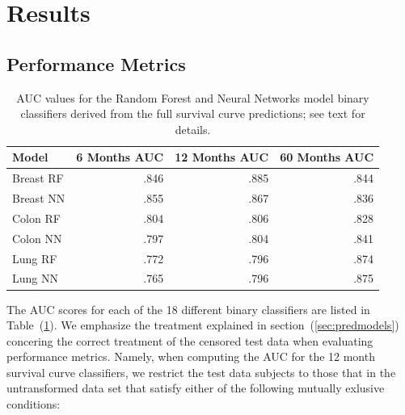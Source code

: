 \documentclass[a4paper,11pt]{article}
\begin{document}
\section{Results}
\label{sec:results}



\subsection{Performance Metrics}
\label{sec:performancemetrics}



\begin{table}[tbp]
\begin{center}
\begin{tabular}{lrrr}
\toprule
Model & 6 Months AUC & 12 Months AUC & 60 Months AUC \\ 
\midrule
Breast RF &  .846       &     .885           &  .844 \\ 
Breast NN &   .855      &     .867      &    .836 \\ 
Colon RF  &     .804          &      .806           &      .828           \\ 
Colon NN   &     .797          &          .804         &   .841  \\ 
Lung RF    &      .772               &        .796               &   .874  \\ 
Lung NN    &        .765              &        .796               &  .875  \\
\bottomrule
\end{tabular}
\caption{\label{tab:AUC} AUC values for the Random Forest and Neural Networks model
binary classifiers derived from the full survival curve predictions; see text for details.}
\end{center}
\end{table}

The AUC scores for each of the 18 different binary classifiers are listed in Table~(\ref{tab:AUC}). We emphasize the treatment explained in section~(\ref{sec:predmodels})  concering the correct treatment of the censored test data when evaluating performance metrics.
Namely, when computing the AUC for the 12 month survival curve classifiers, we restrict the test data subjects to those that in the untransformed data set that satisfy either of the following mutually exlusive conditions:
\end{document}
